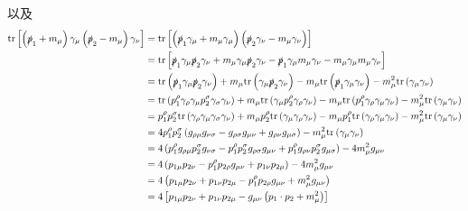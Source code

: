 以及
\begin{equation}
    \begin{aligned}
        \mathrm{tr}\left[ \left( \slashed{p}_1+m_{\mu} \right) \gamma _{\mu}\left( \slashed{p}_2-m_{\mu} \right) \gamma _{\nu} \right] &=\mathrm{tr}\left[ \left( \slashed{p}_1\gamma _{\mu}+m_{\mu}\gamma _{\mu} \right) \left( \slashed{p}_2\gamma _{\nu}-m_{\mu}\gamma _{\nu} \right) \right] 
\\
&=\mathrm{tr}\left[ \slashed{p}_1\gamma _{\mu}\slashed{p}_2\gamma _{\nu}+m_{\mu}\gamma _{\mu}\slashed{p}_2\gamma _{\nu}-\slashed{p}_1\gamma _{\mu}m_{\mu}\gamma _{\nu}-m_{\mu}\gamma _{\mu}m_{\mu}\gamma _{\nu} \right] 
\\
&=\mathrm{tr}\left( \slashed{p}_1\gamma _{\mu}\slashed{p}_2\gamma _{\nu} \right) +m_{\mu}\mathrm{tr}\left( \gamma _{\mu}\slashed{p}_2\gamma _{\nu} \right) -m_{\mu}\mathrm{tr}\left( \slashed{p}_1\gamma _{\mu}\gamma _{\nu} \right) -m_{\mu}^{2}\mathrm{tr}\left( \gamma _{\mu}\gamma _{\nu} \right) 
\\
&=\mathrm{tr}\left( p_{1}^{\rho}\gamma _{\rho}\gamma _{\mu}p_{2}^{\sigma}\gamma _{\sigma}\gamma _{\nu} \right) +m_{\mu}\mathrm{tr}\left( \gamma _{\mu}p_{2}^{\rho}\gamma _{\rho}\gamma _{\nu} \right) -m_{\mu}\mathrm{tr}\left( p_{1}^{\rho}\gamma _{\rho}\gamma _{\mu}\gamma _{\nu} \right) -m_{\mu}^{2}\mathrm{tr}\left( \gamma _{\mu}\gamma _{\nu} \right) 
\\
&=p_{1}^{\rho}p_{2}^{\sigma}\mathrm{tr}\left( \gamma _{\rho}\gamma _{\mu}\gamma _{\sigma}\gamma _{\nu} \right) +m_{\mu}p_{2}^{\rho}\mathrm{tr}\left( \gamma _{\mu}\gamma _{\rho}\gamma _{\nu} \right) -m_{\mu}p_{1}^{\rho}\mathrm{tr}\left( \gamma _{\rho}\gamma _{\mu}\gamma _{\nu} \right) -m_{\mu}^{2}\mathrm{tr}\left( \gamma _{\mu}\gamma _{\nu} \right) 
\\
&=4p_{1}^{\rho}p_{2}^{\sigma}\left( g_{\rho \mu}g_{\nu \sigma}-g_{\rho \sigma}g_{\mu \nu}+g_{\rho \nu}g_{\mu \sigma} \right) -m_{\mu}^{2}\mathrm{tr}\left( \gamma _{\mu}\gamma _{\nu} \right) 
\\
&=4\left( p_{1}^{\rho}g_{\rho \mu}p_{2}^{\sigma}g_{\nu \sigma}-p_{1}^{\rho}p_{2}^{\sigma}g_{\rho \sigma}g_{\mu \nu}+p_{1}^{\rho}g_{\rho \nu}p_{2}^{\sigma}g_{\mu \sigma} \right) -4m_{\mu}^{2}g_{\mu \nu}
\\
&=4\left( p_{1\mu}p_{2\nu}-p_{1}^{\rho}p_{2\rho}g_{\mu \nu}+p_{1\nu}p_{2\mu} \right) -4m_{\mu}^{2}g_{\mu \nu}
\\
&=4\left( p_{1\mu}p_{2\nu}+p_{1\nu}p_{2\mu}-p_{1}^{\rho}p_{2\rho}g_{\mu \nu}+m_{\mu}^{2}g_{\mu \nu} \right) 
\\
&=4\left[ p_{1\mu}p_{2\nu}+p_{1\nu}p_{2\mu}-g_{\mu \nu}\left( p_1\cdot p_2+m_{\mu}^{2} \right) \right] 
    \end{aligned}
\end{equation}
